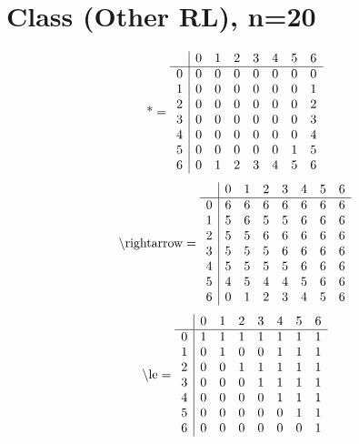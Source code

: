 \documentclass[11pt]{article}
\begin{document}
\section{Class (Other RL), n=20}
\[\text{*} = 
\begin{array}{r | r r r r r r r}
 & 0 & 1 & 2 & 3 & 4 & 5 & 6 \\ \hline
0 & 0 & 0 & 0 & 0 & 0 & 0 & 0 \\
1 & 0 & 0 & 0 & 0 & 0 & 0 & 1 \\
2 & 0 & 0 & 0 & 0 & 0 & 0 & 2 \\
3 & 0 & 0 & 0 & 0 & 0 & 0 & 3 \\
4 & 0 & 0 & 0 & 0 & 0 & 0 & 4 \\
5 & 0 & 0 & 0 & 0 & 0 & 1 & 5 \\
6 & 0 & 1 & 2 & 3 & 4 & 5 & 6 \\
\end{array}
\]
\[\text{\textbackslash rightarrow} = 
\begin{array}{r | r r r r r r r}
 & 0 & 1 & 2 & 3 & 4 & 5 & 6 \\ \hline
0 & 6 & 6 & 6 & 6 & 6 & 6 & 6 \\
1 & 5 & 6 & 5 & 5 & 6 & 6 & 6 \\
2 & 5 & 5 & 6 & 6 & 6 & 6 & 6 \\
3 & 5 & 5 & 5 & 6 & 6 & 6 & 6 \\
4 & 5 & 5 & 5 & 5 & 6 & 6 & 6 \\
5 & 4 & 5 & 4 & 4 & 5 & 6 & 6 \\
6 & 0 & 1 & 2 & 3 & 4 & 5 & 6 \\
\end{array}
\]
\[\text{\textbackslash le} = 
\begin{array}{r | r r r r r r r}
 & 0 & 1 & 2 & 3 & 4 & 5 & 6 \\ \hline
0 & 1 & 1 & 1 & 1 & 1 & 1 & 1 \\
1 & 0 & 1 & 0 & 0 & 1 & 1 & 1 \\
2 & 0 & 0 & 1 & 1 & 1 & 1 & 1 \\
3 & 0 & 0 & 0 & 1 & 1 & 1 & 1 \\
4 & 0 & 0 & 0 & 0 & 1 & 1 & 1 \\
5 & 0 & 0 & 0 & 0 & 0 & 1 & 1 \\
6 & 0 & 0 & 0 & 0 & 0 & 0 & 1 \\
\end{array}
\]
\end{document}

